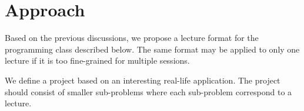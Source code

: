\documentclass{article}
\begin{document}
%
%
%








\section{Approach} %
\label{sec:plan}
Based on the previous discussions, we propose a lecture format for the programming class described below. The same format may be applied to only one lecture if it is too fine-grained for multiple sessions.

We define a project based on an interesting real-life application. The project should consist of smaller sub-problems where each sub-problem correspond to a lecture.
\end{document}
